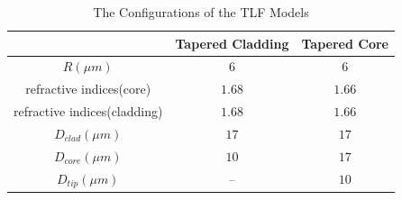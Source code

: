 \begin{table}
\begin{tabular}{ccc}
\hline
							&Tapered Cladding&Tapered Core\\
\hline
$R(\mu m)$ & $6$						 &$6$	\\
refractive indices(core)&$1.68$&$1.66$\\
refractive indices(cladding)&$1.68$&$1.66$\\
$D_{clad}(\mu m)$ &	$17$ &	$17$\\
$D_{core}(\mu m)$ & $10$ &	$17$\\
$D_{tip}(\mu m)$  & --   &	$10$\\
\hline
\end{tabular}
\caption{The Configurations of the TLF Models}
\label{tab:model_fiber_configuration}
\end{table}



\begin{figure}
\setlength{\abovecaptionskip}{0pt}%
\flushleft

\end{figure}

